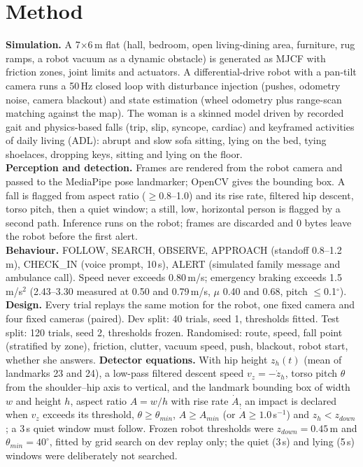 \documentclass[11pt,twocolumn]{article}
\begin{document}
\section{Method}
\textbf{Simulation.} A 7$\times$6\,m flat (hall, bedroom, open living-dining area, furniture, rug ramps, a robot vacuum as a dynamic obstacle) is generated as MJCF with friction zones, joint limits and actuators. A differential-drive robot with a pan-tilt camera runs a 50\,Hz closed loop with disturbance injection (pushes, odometry noise, camera blackout) and state estimation (wheel odometry plus range-scan matching against the map). The woman is a skinned model driven by recorded gait and physics-based falls (trip, slip, syncope, cardiac) and keyframed activities of daily living (ADL): abrupt and slow sofa sitting, lying on the bed, tying shoelaces, dropping keys, sitting and lying on the floor.\\
\textbf{Perception and detection.} Frames are rendered from the robot camera and passed to the MediaPipe pose landmarker; OpenCV gives the bounding box. A fall is flagged from aspect ratio ($\ge$0.8--1.0) and its rise rate, filtered hip descent, torso pitch, then a quiet window; a still, low, horizontal person is flagged by a second path. Inference runs on the robot; frames are discarded and 0 bytes leave the robot before the first alert.\\
\textbf{Behaviour.} FOLLOW, SEARCH, OBSERVE, APPROACH (standoff 0.8--1.2\,m), CHECK\_IN (voice prompt, 10\,s), ALERT (simulated family message and ambulance call). Speed never exceeds 0.80\,m/s; emergency braking exceeds 1.5\,m/s$^2$ (2.43--3.30 measured at 0.50 and 0.79\,m/s, $\mu$ 0.40 and 0.68, pitch $\le$0.1$^\circ$).\\
\textbf{Design.} Every trial replays the same motion for the robot, one fixed camera and four fixed cameras (paired). Dev split: 40 trials, seed 1, thresholds fitted. Test split: 120 trials, seed 2, thresholds frozen. Randomised: route, speed, fall point (stratified by zone), friction, clutter, vacuum speed, push, blackout, robot start, whether she answers.
\textbf{Detector equations.} With hip height $z_h(t)$ (mean of landmarks 23 and 24), a low-pass filtered descent speed $v_z=-\dot z_h$, torso pitch $\theta$ from the shoulder--hip axis to vertical, and the landmark bounding box of width $w$ and height $h$, aspect ratio $A=w/h$ with rise rate $\dot A$, an impact is declared when $v_z$ exceeds its threshold, $\theta\ge\theta_{min}$, $A\ge A_{min}$ (or $\dot A\ge 1.0$\,s$^{-1}$) and $z_h<z_{down}$; a 3\,s quiet window must follow. Frozen robot thresholds were $z_{down}=0.45$\,m and $\theta_{min}=40^\circ$, fitted by grid search on dev replay only; the quiet (3\,s) and lying (5\,s) windows were deliberately not searched.\\
\end{document}
